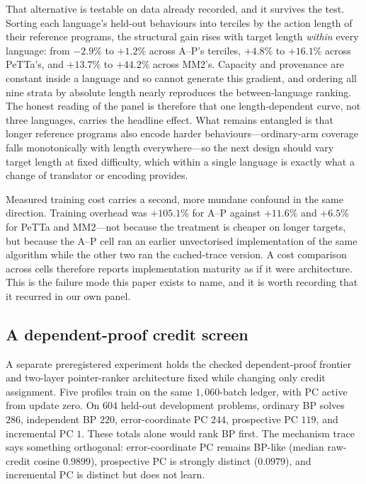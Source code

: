 \documentclass[11pt]{article}
\begin{document}
That alternative is testable on data already recorded, and it survives the test.  Sorting
each language's held-out behaviours into terciles by the action length of their reference
programs, the structural gain rises with target length \emph{within} every language: from
$-2.9\%$ to $+1.2\%$ across A--P's terciles, $+4.8\%$ to $+16.1\%$ across PeTTa's, and
$+13.7\%$ to $+44.2\%$ across MM2's.  Capacity and provenance are constant inside a
language and so cannot generate this gradient, and ordering all nine strata by absolute
length nearly reproduces the between-language ranking.  The honest reading of the panel is
therefore that one length-dependent curve, not three languages, carries the headline
effect.  What remains entangled is that longer reference programs also encode harder
behaviours---ordinary-arm coverage falls monotonically with length everywhere---so the
next design should vary target length at fixed difficulty, which within a single language
is exactly what a change of translator or encoding provides.

Measured training cost carries a second, more mundane confound in the same direction.
Training overhead was $+105.1\%$ for A--P against $+11.6\%$ and $+6.5\%$ for PeTTa and
MM2---not because the treatment is cheaper on longer targets, but because the A--P cell
ran an earlier unvectorised implementation of the same algorithm while the other two ran
the cached-trace version.  A cost comparison across cells therefore reports implementation
maturity as if it were architecture.  This is the failure mode this paper exists to name,
and it is worth recording that it recurred in our own panel.

\subsection{A dependent-proof credit screen}
\label{sec:dtt-credit-screen}

A separate preregistered experiment holds the checked dependent-proof frontier and
two-layer pointer-ranker architecture fixed while changing only credit assignment. Five
profiles train on the same $1{,}060$-batch ledger, with PC active from update zero.
On $604$ held-out development problems, ordinary BP solves $286$, independent BP $220$,
error-coordinate PC $244$, prospective PC $119$, and incremental PC $1$. These totals
alone would rank BP first. The mechanism trace says something orthogonal:
error-coordinate PC remains BP-like (median raw-credit cosine $0.9899$), prospective PC
is strongly distinct ($0.0979$), and incremental PC is distinct but does not learn.
\end{document}
